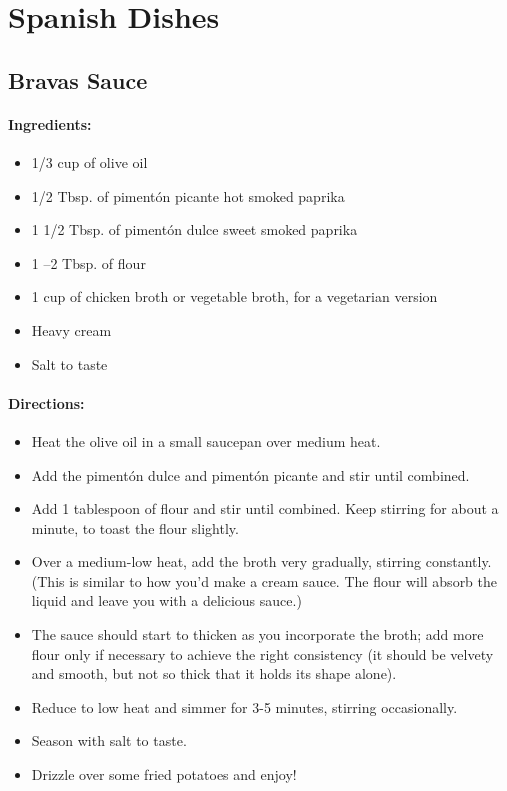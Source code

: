 \documentclass{article}
\begin{document}
\section{Spanish Dishes}


\subsection{Bravas Sauce}

\paragraph{Ingredients:}
\begin{itemize}
    \item 1/3 cup of olive oil
    \item 1/2 Tbsp. of pimentón picante hot smoked paprika
    \item 1 1/2 Tbsp. of pimentón dulce sweet smoked paprika
    \item 1 –2 Tbsp. of flour
    \item 1 cup of chicken broth or vegetable broth, for a vegetarian version
    \item Heavy cream
    \item Salt to taste
\end{itemize}

\paragraph{Directions:}
\begin{itemize}
    \item Heat the olive oil in a small saucepan over medium heat.
    \item Add the pimentón dulce and pimentón picante and stir until combined.
    \item Add 1 tablespoon of flour and stir until combined. Keep stirring for about a minute, to toast the flour slightly.
    \item Over a medium-low heat, add the broth very gradually, stirring constantly. (This is similar to how you'd make a cream sauce. The flour will absorb the liquid and leave you with a delicious sauce.)
    \item The sauce should start to thicken as you incorporate the broth; add more flour only if necessary to achieve the right consistency (it should be velvety and smooth, but not so thick that it holds its shape alone).
    \item Reduce to low heat and simmer for 3-5 minutes, stirring occasionally.
    \item Season with salt to taste.
    \item Drizzle over some fried potatoes and enjoy!
\end{itemize}
\end{document}
